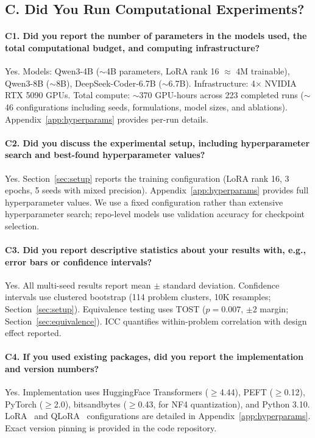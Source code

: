 \subsection*{C. Did You Run Computational Experiments?}

\paragraph{C1. Did you report the number of parameters in the models used, the total computational budget, and computing infrastructure?}
Yes. Models: Qwen3-4B (${\sim}$4B parameters, LoRA rank 16 $\approx$ 4M trainable), Qwen3-8B (${\sim}$8B), DeepSeek-Coder-6.7B (${\sim}$6.7B). Infrastructure: 4$\times$ NVIDIA RTX 5090 GPUs. Total compute: ${\sim}$370 GPU-hours across 223 completed runs (${\sim}$46 configurations including seeds, formulations, model sizes, and ablations). Appendix~\ref{app:hyperparams} provides per-run details.

\paragraph{C2. Did you discuss the experimental setup, including hyperparameter search and best-found hyperparameter values?}
Yes. Section~\ref{sec:setup} reports the training configuration (LoRA rank 16, 3 epochs, 5 seeds with mixed precision). Appendix~\ref{app:hyperparams} provides full hyperparameter values. We use a fixed configuration rather than extensive hyperparameter search; repo-level models use validation accuracy for checkpoint selection.

\paragraph{C3. Did you report descriptive statistics about your results with, e.g., error bars or confidence intervals?}
Yes. All multi-seed results report mean $\pm$ standard deviation. Confidence intervals use clustered bootstrap (114 problem clusters, 10K resamples; Section~\ref{sec:setup}). Equivalence testing uses TOST ($p = 0.007$, $\pm$2\pp{} margin; Section~\ref{sec:equivalence}). ICC quantifies within-problem correlation with design effect reported.

\paragraph{C4. If you used existing packages, did you report the implementation and version numbers?}
Yes. Implementation uses HuggingFace Transformers (${\geq}$4.44), PEFT (${\geq}$0.12), PyTorch (${\geq}$2.0), bitsandbytes (${\geq}$0.43, for NF4 quantization), and Python 3.10. LoRA~\cite{hu2022lora} and QLoRA~\cite{dettmers2024qlora} configurations are detailed in Appendix~\ref{app:hyperparams}. Exact version pinning is provided in the code repository.


